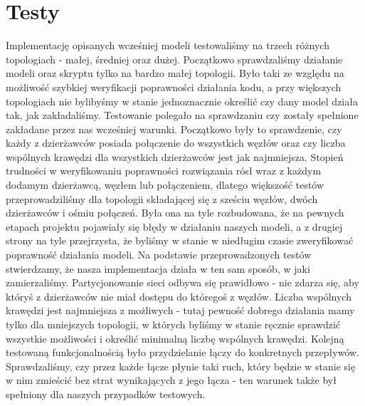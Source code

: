 \section{Testy}
Implementację opisanych wcześniej modeli testowaliśmy na trzech różnych topologiach - małej, średniej oraz
dużej. Początkowo sprawdzaliśmy działanie modeli oraz skryptu tylko na bardzo małej topologii. Było taki
ze względu na możliwość szybkiej weryfikacji poprawności działania kodu, a przy większych
topologiach nie bylibyśmy w stanie jednoznacznie określić czy dany model działa tak, jak zakładaliśmy.
\newline \newline
Testowanie polegało na sprawdzaniu czy zostały spełnione zakładane przez nas wcześniej warunki. Początkowo
były to sprawdzenie, czy każdy z dzierżawców posiada połączenie do wszystkich węzłów oraz czy liczba
wspólnych krawędzi dla wszystkich dzierżawców jest jak najmniejsza. Stopień trudności w weryfikowaniu
poprawności rozwiązania rósł wraz z każdym dodamym dzierżawcą, węzłem lub połączeniem, dlatego większość
testów przeprowadziliśmy dla topologii składającej się z sześciu węzłów, dwóch dzierżawców i ośmiu połączeń.
Była ona na tyle rozbudowana, że na pewnych etapach projektu pojawiały się błędy w działaniu naszych modeli,
a z drugiej strony na tyle przejrzysta, że byliśmy w stanie w niedługim czasie zweryfikować poprawność działania
modeli.
\newline \newline
Na podstawie przeprowadzonych testów stwierdzamy, że nasza implementacja działa w ten sam sposób,
w jaki zamierzaliśmy. Partycjonowanie sieci odbywa się prawidłowo - nie zdarza się, aby któryś z dzierżawców
nie miał dostępu do któregoś z węzłów. Liczba wspólnych krawędzi jest najmniejsza z możliwych - tutaj pewność
dobrego działania mamy tylko dla mniejszych topologii, w których byliśmy w stanie ręcznie sprawdzić wszystkie
możliwości i określić minimalną liczbę wspólnych krawędzi. Kolejną testowaną funkcjonalnością było
przydzielanie łączy do konkretnych przepływów. Sprawdzaliśmy, czy przez każde łącze płynie taki ruch, który
będzie w stanie się w nim zmieścić bez strat wynikających z jego łącza -
ten warunek także był spełniony dla naszych przypadków testowych.
